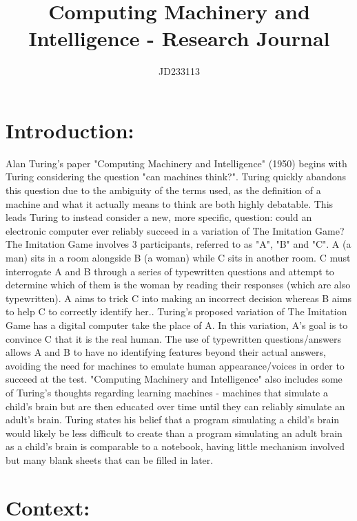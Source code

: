\documentclass{article}
\title{Computing Machinery and Intelligence - Research Journal}
\author{JD233113}
\begin{document}
\maketitle
\begin{flushleft}

\section{Introduction:}

Alan Turing's paper "Computing Machinery and Intelligence" (1950) begins with Turing considering the question "can machines think?". Turing quickly abandons this question due to the ambiguity of the terms used, as the definition of a machine and what it actually means to think are both highly debatable. This leads Turing to instead consider a new, more specific, question: could an electronic computer ever reliably succeed in a variation of The Imitation Game?
\break
\break
The Imitation Game involves 3 participants, referred to as "A", "B" and "C". A (a man) sits in a room alongside B (a woman) while C sits in another room. C must interrogate A and B through a series of typewritten questions and attempt to determine which of them is the woman by reading their responses (which are also typewritten). A aims to trick C into making an incorrect decision whereas B aims to help C to correctly identify her.\cite{turing1950_intelligence}. Turing's proposed variation of The Imitation Game has a digital computer take the place of A. In this variation, A's goal is to convince C that it is the real human. The use of typewritten questions/answers allows A and B to have no identifying features beyond their actual answers, avoiding the need for machines to emulate human appearance/voices in order to succeed at the test.
\break
\break
"Computing Machinery and Intelligence" also includes some of Turing's thoughts regarding learning machines - machines that simulate a child's brain but are then educated over time until they can reliably simulate an adult's brain. Turing states his belief that a program simulating a child's brain would likely be less difficult to create than a program simulating an adult brain as a child's brain is comparable to a notebook, having little mechanism involved but many blank sheets that can be filled in later.

\section{Context:}


\end{flushleft}
\end{document}
